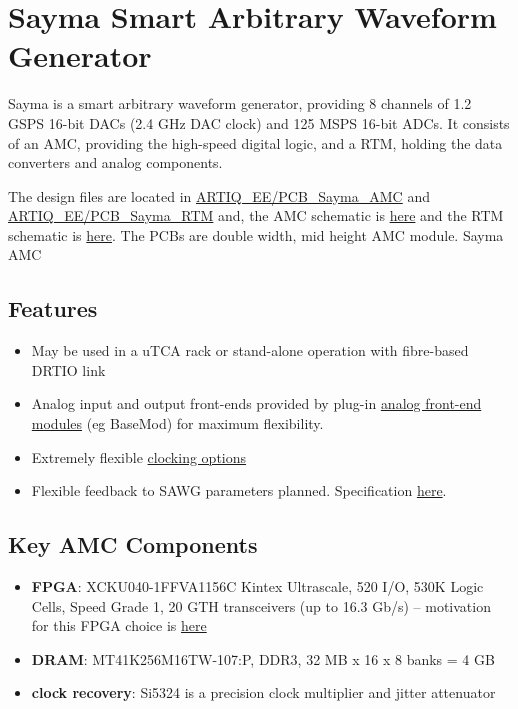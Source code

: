 \section{Sayma Smart Arbitrary Waveform
Generator}\label{sayma-smart-arbitrary-waveform-generator}

Sayma is a smart arbitrary waveform generator, providing 8 channels of
1.2 GSPS 16-bit DACs (2.4 GHz DAC clock) and 125 MSPS 16-bit ADCs. It
consists of an AMC, providing the high-speed digital logic, and a RTM,
holding the data converters and analog components.

The design files are located in
\href{https://github.com/m-labs/sinara/tree/master/ARTIQ_EE/PCB_Sayma_AMC}{ARTIQ\_EE/PCB\_Sayma\_AMC}
and
\href{https://github.com/m-labs/sinara/tree/master/ARTIQ_EE/PCB_Sayma_RTM}{ARTIQ\_EE/PCB\_Sayma\_RTM}
and, the AMC schematic is
\href{https://github.com/m-labs/sinara/blob/master/ARTIQ_EE/Sayma_AMC.pdf}{here}
and the RTM schematic is
\href{https://github.com/m-labs/sinara/blob/master/ARTIQ_EE/Sayma_RTM.pdf}{here}.
The PCBs are double width, mid height AMC module. Sayma AMC

\subsection{Features}\label{features}

\begin{itemize}

\item
  May be used in a uTCA rack or stand-alone operation with fibre-based
  DRTIO link
\item
  Analog input and output front-ends provided by plug-in
  \href{SaymaAFE}{analog front-end modules} (eg BaseMod) for maximum
  flexibility.
\item
  Extremely flexible \href{SinaraClocking}{clocking options}
\item
  Flexible feedback to SAWG parameters planned. Specification
  \href{Servo}{here}.
\end{itemize}

\subsection{Key AMC Components}\label{key-amc-components}

\begin{itemize}

\item
  \textbf{FPGA}: XCKU040-1FFVA1156C Kintex Ultrascale, 520 I/O, 530K
  Logic Cells, Speed Grade 1, 20 GTH transceivers (up to 16.3 Gb/s) --
  motivation for this FPGA choice is
  \href{https://github.com/m-labs/sinara/wiki/artiq_hardware\#recommendation}{here}
\item
  \textbf{DRAM}: MT41K256M16TW-107:P, DDR3, 32 MB x 16 x 8 banks = 4 GB
\item
  \textbf{clock recovery}: Si5324 is a precision clock multiplier and
  jitter attenuator
\end{itemize}

